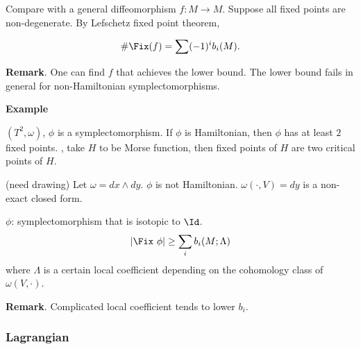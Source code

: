 Compare with a general diffeomorphism $f:M\to M$.
Suppose all fixed points are non-degenerate.
By Lefschetz fixed point theorem,

\begin{framed}
    \missref
\end{framed}

\begin{equation}
    \#\Fix(f) = \sum(-1)^i b_i(M).
\end{equation}

\textbf{Remark}.
\warn
One can find $f$ that achieves the lower bound.
The lower bound fails in general for non-Hamiltonian symplectomorphisms.

\textbf{Example}

$(T^2,\omega)$, $\phi$ is a symplectomorphism.
If $\phi$ is Hamiltonian, then $\phi$ has at least $2$ fixed points.
\eg,
take $H$ to be Morse function,
then fixed points of $H$ are two critical points of $H$.

\todo (need drawing)
Let $\omega=dx\wedge dy$.
$\phi$ is not Hamiltonian.
$\omega(\cdot, V)=dy$ is a non-exact closed form.


\begin{conj}
    $\phi$: symplectomorphism that is isotopic to $\Id$.
    \begin{equation}
        |\Fix~\phi | \ge \sum_i b_i(M;\Lambda)
    \end{equation}
    where $\Lambda$ is a certain local coefficient depending on the
    cohomology class of $\omega(V,\cdot)$.
\end{conj}

\textbf{Remark}. Complicated local coefficient tends to lower $b_i$.

\subsubsection{Lagrangian}
